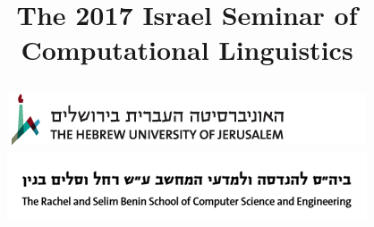 \documentclass[a0,portrait]{a0poster}
\makeatletter
\renewcommand{\maketitle}{\bgroup\setlength{\parindent}{0pt}
\begin{flushleft}
    \fontsize{100pt}{140pt}\selectfont{\@title}
\end{flushleft}\egroup
}
\makeatother
\begin{document}
    \title{
    \begin{minipage}{.57\textwidth}
        The 2017 Israel Seminar of Computational Linguistics
    \end{minipage}
    \hfill
    \begin{minipage}{.4\textwidth}
        \includegraphics[width=\textwidth]{huji_banner.png}
        \includegraphics[width=\textwidth]{cse_banner.png}
    \end{minipage}
    }
    \maketitle
\end{document}
